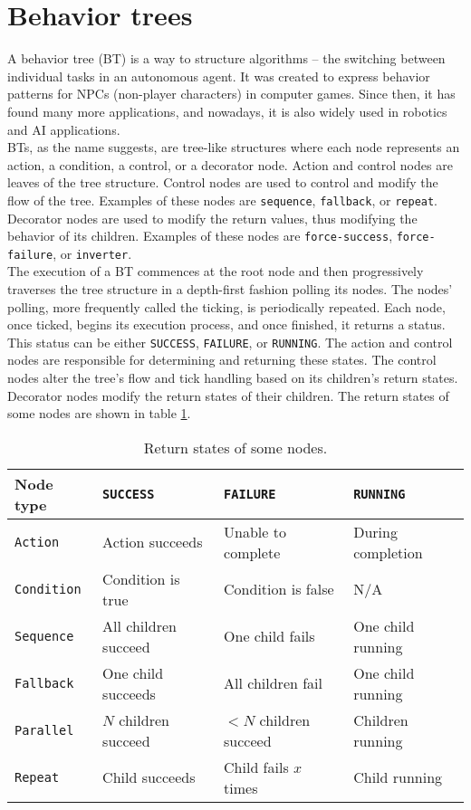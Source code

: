 \section{Behavior trees}
    A behavior tree (BT) is a way to structure algorithms -- the switching between individual tasks in an autonomous agent. It was created to express behavior patterns for NPCs (non-player characters) in computer games. Since then, it has found many more applications, and nowadays, it is also widely used in robotics and AI applications.\\
    BTs, as the name suggests, are tree-like structures where each node represents an action, a condition, a control, or a decorator node. Action and control nodes are leaves of the tree structure. Control nodes are used to control and modify the flow of the tree. Examples of these nodes are \texttt{sequence}, \texttt{fallback}, or \texttt{repeat}. Decorator nodes are used to modify the return values, thus modifying the behavior of its children. Examples of these nodes are \texttt{force-success}, \texttt{force-failure}, or \texttt{inverter}.\\
    The execution of a BT commences at the root node and then progressively traverses the tree structure in a depth-first fashion polling its nodes. The nodes' polling, more frequently called the ticking, is periodically repeated. Each node, once ticked, begins its execution process, and once finished, it returns a status. This status can be either \texttt{SUCCESS}, \texttt{FAILURE}, or \texttt{RUNNING}. The action and control nodes are responsible for determining and returning these states. The control nodes alter the tree's flow and tick handling based on its children's return states. Decorator nodes modify the return states of their children. The return states of some nodes are shown in table \ref{tab:returns}.
    \begin{table}[H]
        \centering
        \begin{tabular}{|l|l|l|l|}
            \hline
            Node type & \texttt{SUCCESS} & \texttt{FAILURE} & \texttt{RUNNING} \\
            \hline\hline
            \texttt{Action} & Action succeeds & Unable to complete & During completion \\
            \hline
            \texttt{Condition} & Condition is true & Condition is false & N/A \\
            \hline
            \texttt{Sequence} & All children succeed & One child fails & One child running \\
            \hline
            \texttt{Fallback} & One child succeeds & All children fail & One child running \\
            \hline
            \texttt{Parallel} & $N$ children succeed & $<N$ children succeed & Children running \\
            \hline
            \texttt{Repeat} & Child succeeds & Child fails $x$ times & Child running \\
            \hline
        \end{tabular}
        \caption{Return states of some nodes.}
        \label{tab:returns}
    \end{table}


